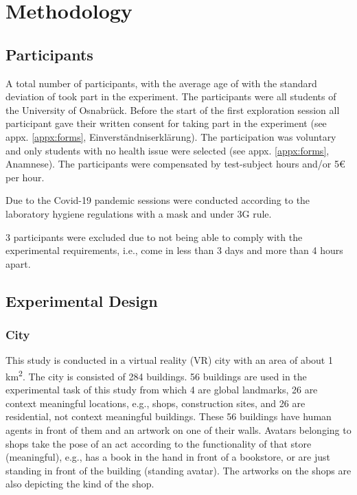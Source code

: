 \chapter{Methodology}

\section{Participants}

A total number of  participants,  with the average age of  with the standard deviation of  took part in the experiment. The participants were all students of the University of Osnabrück. Before the start of the first exploration session all participant gave their written consent for taking part in the experiment (see appx. \ref{appx:forms}, Einverständniserklärung). The participation was voluntary and only students with no health issue were selected (see appx. \ref{appx:forms}, Anamnese). The participants were compensated by test-subject hours and/or 5€ per hour.  

Due to the Covid-19 pandemic sessions were conducted according to the laboratory hygiene regulations with a mask and under 3G rule.

3 participants were excluded due to not being able to comply with the experimental requirements, i.e., come in less than 3 days and more than 4 hours apart.



\section{Experimental Design}

\subsection{City}

This study is conducted in a virtual reality (VR) city with an area of about 1 km\textsuperscript2. The city is consisted of 284 buildings. 56 buildings are used in the experimental task of this study from which 4 are global landmarks, 26 are {\emphasize context meaningful} locations, e.g., shops, construction sites, and 26 are residential, {\emphasize not context meaningful} buildings. These 56 buildings have human agents in front of them and an artwork on one of their walls. Avatars belonging to shops take the pose of an act according to the functionality of that store {\emphasize(meaningful)}, e.g., has a book in the hand in front of a bookstore, or are just standing in front of the building {\emphasize(standing avatar)}. The artworks on the shops are also depicting the kind of the shop.

